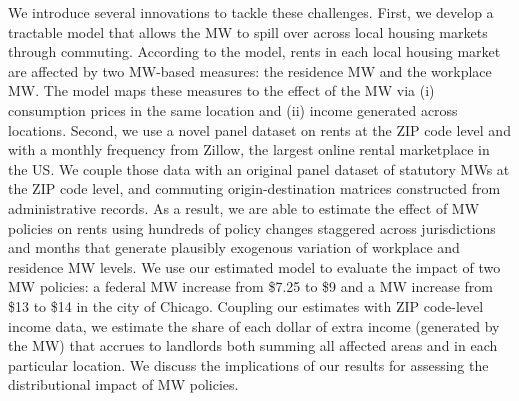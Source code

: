 
We introduce several innovations to tackle these challenges.
First, we develop a tractable model that allows the MW to spill over 
across local housing markets through commuting.
According to the model, rents in each local housing market are affected by 
two MW-based measures:
the residence MW and the workplace MW.
The model maps these measures to the effect of the MW via 
(i) consumption prices in the same location and
(ii) income generated across locations.
Second, we use a novel panel dataset on rents at the ZIP code level and with 
a monthly frequency from Zillow, the largest online rental marketplace in the US.
We couple those data with an original panel dataset of statutory MWs 
at the ZIP code level, and commuting origin-destination matrices constructed
from administrative records.
As a result, we are able to estimate the effect of MW policies on rents using 
hundreds of policy changes staggered across jurisdictions and months that 
generate plausibly exogenous variation of workplace and residence MW levels.
We use our estimated model to evaluate the impact of two MW policies:
a federal MW increase from \$7.25 to \$9 and
a MW increase from \$13 to \$14 in the city of Chicago.
Coupling our estimates with ZIP code-level income data, we estimate the share of 
each dollar of extra income (generated by the MW) that accrues to landlords
both summing all affected areas and in each particular location.
We discuss the implications of our results for assessing the distributional 
impact of MW policies.


